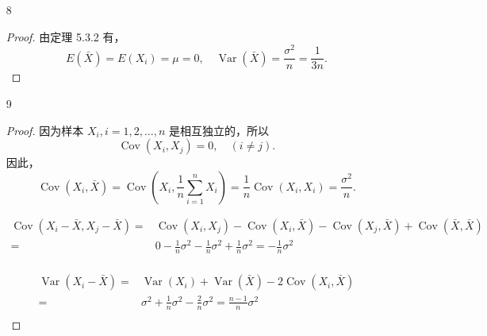 \documentclass[normal,founder,mtpro2,cn]{elegantnote}
\begin{document}
\begin{enumerate}
        \item[8] 
        \begin{proof}
            由定理 5.3.2 有，
            \begin{equation*}
                E(\bar{X})=E(X_i)=\mu=0,\quad \operatorname{Var}(\bar{X})=\frac{\sigma^2}{n}=\frac{1}{3n}.
            \end{equation*}
        \end{proof}
    
        \item[9] 
        \begin{proof}
            因为样本 $X_{i},i=1,2,\ldots,n$ 是相互独立的，所以
            \begin{equation*}
                \operatorname{Cov}\left(X_{i},X_{j}\right)=0,\quad(i\neq j).
            \end{equation*}
            因此，
            \begin{equation*}
                \operatorname{Cov}\left(X_{i},\bar{X}\right)=\operatorname{Cov}\left(X_{i},\frac{1}{n}
                \sum_{i=1}^nX_{i}\right)=\frac{1}{n}\operatorname{Cov}\left(X_{i},X_{i}\right)=\frac{\sigma^2}{n}.
            \end{equation*}
    
            \begin{equation*}
                \begin{aligned}
                    \operatorname{Cov}\left(X_{i}-\bar{X}, X_{j}-\bar{X}\right)=&\operatorname{Cov}\left(X_{i}, X_{j}\right)-\operatorname{Cov}\left(X_{i}, \bar{X}\right)-\operatorname{Cov}\left(X_{j},\bar{X}\right)+\operatorname{Cov}(\bar{X}, \bar{X}) \\
                    =&0-\frac{1}{n}\sigma^{2}-\frac{1}{n}\sigma^{2}+\frac{1}{n}\sigma^{2}=-\frac{1}{n}\sigma^{2} \\
                \end{aligned}
            \end{equation*}
    
            \begin{equation*}
                \begin{aligned}
                    \operatorname{Var}\left(X_{i}-\bar{X}\right)=&\operatorname{Var}\left(X_{i}\right)+\operatorname{Var}(\bar{X})-2 \operatorname{Cov}\left(X_{i}, \bar{X}\right) \\
                    =&\sigma^{2}+\frac{1}{n} \sigma^{2}-\frac{2}{n} \sigma^{2}=\frac{n-1}{n} \sigma^{2} \\
                \end{aligned}
            \end{equation*}
    

\end{proof}
\end{enumerate}
\end{document}
